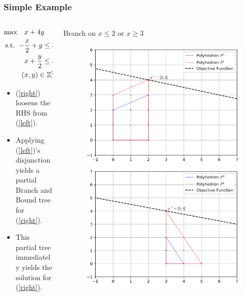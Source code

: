 \documentclass{beamer}
\begin{document}
	\begin{frame}[t]
		\frametitle{Simple Example}
		\footnotesize
		\begin{columns}[T]
			\begin{column}{0.3\textwidth}
				\vspace{-.25cm}
				\begin{align}
					\begin{split}
						\text{max} \quad &x + 4y \\
						\text{s.t.} \; \; -&\frac{x}{2} + y \leq 3, \\
						&x + \frac{y}{2} \leq 5, \\
						(&x, y) \in \mathbb{Z}^2_+
					\end{split}
					\label{right}
				\end{align}
				\begin{itemize}
					\item (\ref{right}) loosens the RHS from (\ref{left}).
					\item Applying (\ref{left})'s disjunction yields a partial Branch and Bound tree for (\ref{right}).
					\item This partial tree immediately yields the solution for (\ref{right}).
				\end{itemize}
			\end{column}
			\begin{column}{0.7\textwidth}
				\vspace{3.25cm}
				\centering
				Branch on $ x \leq 2 $ or $ x \geq 3 $
				\vspace{-.25cm}
				\begin{figure}[]
					\centering
					\includegraphics[width=.45\textwidth]{P1_prime.png}
					\hfill
					\includegraphics[width=.45\textwidth]{P2_prime.png}

\end{figure}
\end{column}
\end{columns}
\end{frame}
\end{document}
